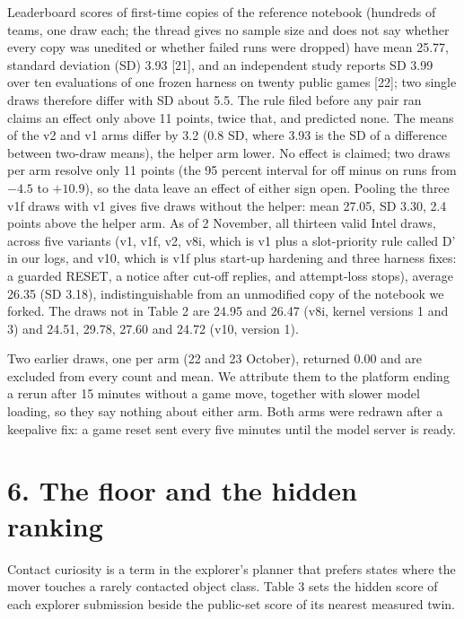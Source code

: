 \documentclass[
  11pt,
]{article}
\newcounter{none} %
\begin{document}
Leaderboard scores of first-time copies of the reference notebook
(hundreds of teams, one draw each; the thread gives no sample size and
does not say whether every copy was unedited or whether failed runs were
dropped) have mean 25.77, standard deviation (SD) 3.93 {[}21{]}, and an
independent study reports SD 3.99 over ten evaluations of one frozen
harness on twenty public games {[}22{]}; two single draws therefore
differ with SD about 5.5. The rule filed before any pair ran claims an
effect only above 11 points, twice that, and predicted none. The means
of the v2 and v1 arms differ by 3.2 (0.8 SD, where 3.93 is the SD of a
difference between two-draw means), the helper arm lower. No effect is
claimed; two draws per arm resolve only 11 points (the 95 percent
interval for off minus on runs from \(-4.5\) to \(+10.9\)), so the data
leave an effect of either sign open. Pooling the three v1f draws with v1
gives five draws without the helper: mean 27.05, SD 3.30, 2.4 points
above the helper arm. As of 2 November, all thirteen valid Intel draws,
across five variants (v1, v1f, v2, v8i, which is v1 plus a slot-priority
rule called D' in our logs, and v10, which is v1f plus start-up
hardening and three harness fixes: a guarded RESET, a notice after
cut-off replies, and attempt-loss stops), average 26.35 (SD 3.18),
indistinguishable from an unmodified copy of the notebook we forked. The
draws not in Table 2 are 24.95 and 26.47 (v8i, kernel versions 1 and 3)
and 24.51, 29.78, 27.60 and 24.72 (v10, version 1).

Two earlier draws, one per arm (22 and 23 October), returned 0.00 and
are excluded from every count and mean. We attribute them to the
platform ending a rerun after 15 minutes without a game move, together
with slower model loading, so they say nothing about either arm. Both
arms were redrawn after a keepalive fix: a game reset sent every five
minutes until the model server is ready.

\section{6. The floor and the hidden
ranking}\label{the-floor-and-the-hidden-ranking}

Contact curiosity is a term in the explorer's planner that prefers
states where the mover touches a rarely contacted object class. Table 3
sets the hidden score of each explorer submission beside the public-set
score of its nearest measured twin.
\end{document}
